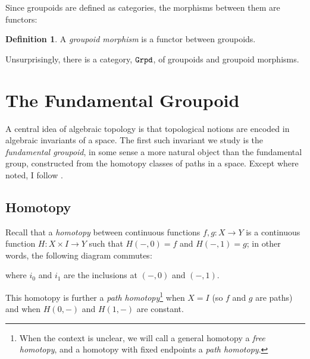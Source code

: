 \documentclass[11 pt]{amsart}
\theoremstyle{plain}   %
\theoremstyle{definition}
\newtheorem{defn}{Definition}[section]
\theoremstyle{remark}
\numberwithin{equation}{section}
\newcommand{\punctuation}[1]{\makebox[0pt][l]{#1}}
\newcommand{\cat}[1]{{\normalfont\texttt{#1}}}
\begin{document}
Since groupoids are defined as categories, the morphisms between them are
functors:

\begin{defn}\cite[Section 6.4]{Brown}
	A \emph{groupoid morphism} is a functor between groupoids.
\end{defn}

Unsurprisingly, there is a category, $\cat{Grpd}$, of groupoids and groupoid
morphisms.

\section{The Fundamental Groupoid} \label{the fundamental groupoid}

A central idea of algebraic topology is that topological notions are encoded in
algebraic invariants of a space. The first such invariant we study is the
\emph{fundamental groupoid}, in some sense a more natural object than the
fundamental group, constructed from the homotopy classes of paths in a space.
Except where noted, I follow \cite[Chapter 6]{Bradley}.

\subsection{Homotopy}\label{sec:homotopy}

Recall that a \emph{homotopy} between continuous functions $f,g: X\rightarrow Y$
is a continuous function $H: X\times I\rightarrow Y$ such that $H(-, 0) = f$ and
$H(-, 1) = g$; in other words, the following diagram commutes:

\begin{figure}[H]
	\centering
\end{figure}

where $i_0$ and $i_1$ are the inclusions at $(-, 0)$ and $(-, 1)$.

This homotopy is further a \emph{path homotopy}\footnote{ When
	the context is unclear, we will call a general homotopy a \emph{free
		homotopy}, and a homotopy with fixed endpoints a \emph{path homotopy}. } when $X
	= I$ (so $f$ and $g$ are paths) and when $H(0, -)$ and $H(1, -)$ are constant.
\end{document}
